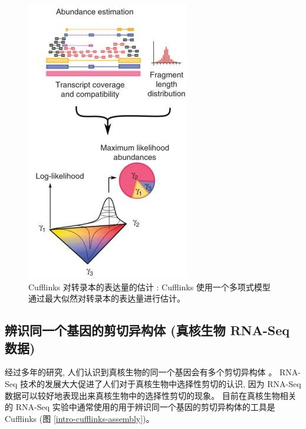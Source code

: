 \begin{figure}[!t]
\centering
\includegraphics[height=0.5\textheight]{figures/cufflinks-abundance.jpg}
\caption[Cufflinks 对转录本的表达量的估计 \cite{cufflinks.2010}]
{Cufflinks 对转录本的表达量的估计 \cite{cufflinks.2010}: 
Cufflinks 使用一个多项式模型通过最大似然对转录本的表达量进行估计。}
\label{intro-cufflinks-abundance}
\end{figure}

\subsection{辨识同一个基因的剪切异构体 (真核生物 RNA-Seq 数据)}
经过多年的研究, 人们认识到真核生物的同一个基因会有多个剪切异构体 
\cite{gilbert1978genes, rosenfeld1982calcitonin, early1980two, 
citeulike:447573, modrek2002genomic}。 
RNA-Seq 技术的发展大大促进了人们对于真核生物中选择性剪切的认识, 
因为 RNA-Seq 数据可以较好地表现出来真核生物中的选择性剪切的现象。 
目前在真核生物相关的 RNA-Seq 实验中通常使用的用于辨识同一个基因的剪切异构体的工具是 
Cufflinks \cite{cufflinks.2010} (图 \ref{intro-cufflinks-assembly})。

